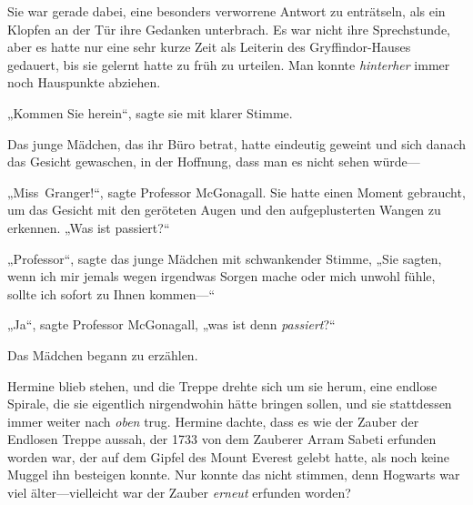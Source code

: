 Sie war gerade dabei, eine besonders verworrene Antwort zu enträtseln, als ein Klopfen an der Tür ihre Gedanken unterbrach. Es war nicht ihre Sprechstunde, aber es hatte nur eine sehr kurze Zeit als Leiterin des Gryffindor-Hauses gedauert, bis sie gelernt hatte zu früh zu urteilen. Man konnte \emph{hinterher} immer noch Hauspunkte abziehen.

„Kommen Sie herein“, sagte sie mit klarer Stimme.

Das junge Mädchen, das ihr Büro betrat, hatte eindeutig geweint und sich danach das Gesicht gewaschen, in der Hoffnung, dass man es nicht sehen würde—

„Miss~Granger!“, sagte Professor McGonagall. Sie hatte einen Moment gebraucht, um das Gesicht mit den geröteten Augen und den aufgeplusterten Wangen zu erkennen. „Was ist passiert?“

„Professor“, sagte das junge Mädchen mit schwankender Stimme, „Sie sagten, wenn ich mir jemals wegen irgendwas Sorgen mache oder mich unwohl fühle, sollte ich sofort zu Ihnen kommen—“

„Ja“, sagte Professor McGonagall, „was ist denn \emph{passiert}?“

Das Mädchen begann zu erzählen.

\later

Hermine blieb stehen, und die Treppe drehte sich um sie herum, eine endlose Spirale, die sie eigentlich nirgendwohin hätte bringen sollen, und sie stattdessen immer weiter nach \emph{oben} trug. Hermine dachte, dass es wie der Zauber der Endlosen Treppe aussah, der 1733 von dem Zauberer Arram Sabeti erfunden worden war, der auf dem Gipfel des Mount Everest gelebt hatte, als noch keine Muggel ihn besteigen konnte. Nur konnte das nicht stimmen, denn Hogwarts war viel älter—vielleicht war der Zauber \emph{erneut} erfunden worden?


